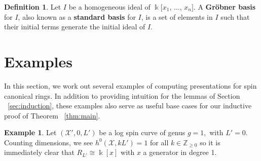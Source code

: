 \documentclass{amsart}
\theoremstyle{plain}
\theoremstyle{definition}
\newtheorem{defn}[thm]{Definition}
\newtheorem{example}[thm]{Example}
\theoremstyle{remark}
\numberwithin{equation}{section}
\newcommand\Bk{{\Bbbk}}
\newcommand\sx{\mathscr X}
\newcommand{\halfcan}{L}
\begin{document}
\begin{defn}
\label{defn:grobner-basis}
Let $I$ be a homogeneous ideal of $\Bk[x_{1}$, $\ldots$,
$x_{n}]$. A \textbf{Gr\"obner basis} for $I$, also known as a
\textbf{standard basis} for $I$, is a set of elements in $I$
such that their initial terms generate the initial
ideal of $I$.
\end{defn}


\section{Examples}
\label{sec:examples}

In this section, we work out several examples of computing presentations for spin canonical rings. In addition to providing intuition for the lemmas of Section ~\ref{sec:induction}, these examples also serve as useful base cases for our inductive proof of Theorem ~\ref{thm:main}.

\begin{example}
\label{eg:base-1-0}
Let $(\sx',0, \halfcan')$ be a log spin curve of genus $g = 1,$ with $\halfcan' = 0$.
Counting dimensions, we see $h^0(\sx, k\halfcan')=1$ for all $k \in \mathbb{Z}_{\ge 0}$ so it is immediately clear that $R_{\halfcan'} \cong \Bk[x]$ with $x$ a generator in degree 1.
\end{example}
\end{document}

